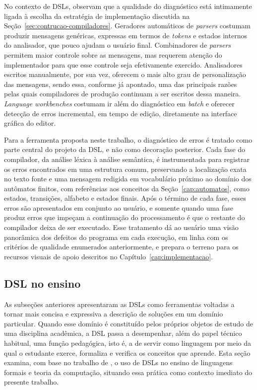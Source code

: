 \documentclass[
    12pt
    ,oneside
    ,a4paper
    ,chapter=TITLE
    ,section=TITLE
    ,sumario=abnt-6027-2012]{abntex2}
\begin{document}
No contexto de DSLs,  observam que a qualidade do diagnóstico está
intimamente ligada à escolha da estratégia de implementação discutida na Seção~\ref{sec:contrucao-compiladores}.
Geradores automáticos de \textit{parsers} costumam produzir mensagens genéricas, expressas em
termos de \textit{tokens} e estados internos do analisador, que pouco ajudam o usuário final.
Combinadores de \textit{parsers} permitem maior controle sobre as mensagens, mas requerem
atenção do implementador para que esse controle seja efetivamente exercido. Analisadores
escritos manualmente, por sua vez, oferecem o mais alto grau de personalização das mensagens,
sendo essa, conforme já apontado, uma das principais razões pelas quais compiladores de
produção continuam a ser escritos dessa maneira. \textit{Language workbenches} costumam ir além
do diagnóstico em \textit{batch} e oferecer detecção de erros incremental, em tempo de edição,
diretamente na interface gráfica do editor.

Para a ferramenta proposta neste trabalho, o diagnóstico de erros é tratado como parte central
do projeto da DSL, e não como decoração posterior. Cada fase do compilador, da análise léxica à
análise semântica, é instrumentada para registrar os erros encontrados em uma estrutura comum,
preservando a localização exata no texto fonte e uma mensagem redigida em vocabulário próximo
ao domínio dos autômatos finitos, com referências aos conceitos da Seção~\ref{cap:automatos},
como estados, transições, alfabeto e estados finais. Após o término de cada fase, esses erros
são apresentados em conjunto ao usuário, e somente quando uma fase produz erros que impeçam a
continuação do processamento é que o restante do compilador deixa de ser executado. Esse
tratamento dá ao usuário uma visão panorâmica dos defeitos do programa em cada execução, em
linha com os critérios de qualidade enumerados anteriormente, e prepara o terreno para os
recursos visuais de apoio descritos no Capítulo~\ref{cap:implementacao}.

\subsection{DSL no ensino}
\label{sec:dsl-ensino}

As subseções anteriores apresentaram as DSLs como ferramentas voltadas a tornar mais
concisa e expressiva a descrição de soluções em um domínio particular. Quando esse domínio é
constituído pelos próprios objetos de estudo de uma disciplina acadêmica, a DSL passa a
desempenhar, além do papel técnico habitual, uma função pedagógica, isto é, a de servir como
linguagem por meio da qual o estudante exerce, formaliza e verifica os conceitos que aprende.
Esta seção examina, com base no trabalho de , o uso de DSLs
no ensino de linguagens formais e teoria da computação, situando essa prática como contexto
imediato do presente trabalho.
\end{document}
